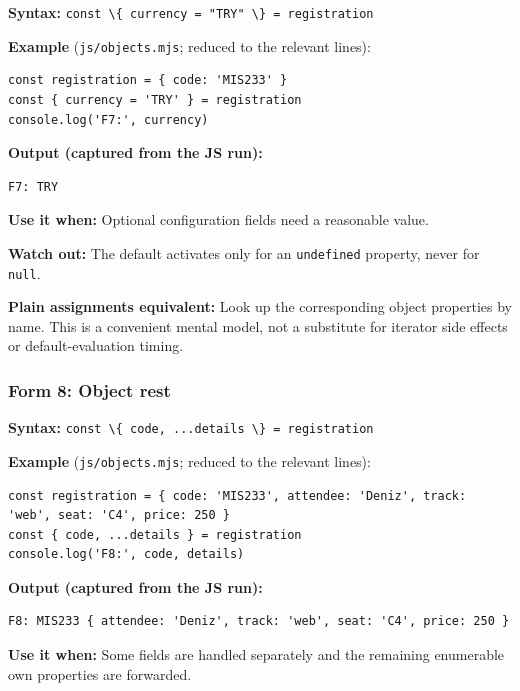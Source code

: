 \documentclass[
  10pt,
]{article}
\newcommand{\passthrough}[1]{#1}
\begin{document}
\textbf{Syntax:}
\passthrough{\lstinline!const \{ currency = "TRY" \} = registration!}

\textbf{Example} (\passthrough{\lstinline!js/objects.mjs!}; reduced to
the relevant lines):

\begin{lstlisting}
const registration = { code: 'MIS233' }
const { currency = 'TRY' } = registration
console.log('F7:', currency)
\end{lstlisting}

\textbf{Output (captured from the JS run):}

\begin{lstlisting}
F7: TRY
\end{lstlisting}

\textbf{Use it when:} Optional configuration fields need a reasonable
value.

\textbf{Watch out:} The default activates only for an
\passthrough{\lstinline!undefined!} property, never for
\passthrough{\lstinline!null!}.

\textbf{Plain assignments equivalent:} Look up the corresponding object
properties by name. This is a convenient mental model, not a substitute
for iterator side effects or default-evaluation timing.

\subsubsection{Form 8: Object rest}\label{form-8-object-rest}

\textbf{Syntax:}
\passthrough{\lstinline!const \{ code, ...details \} = registration!}

\textbf{Example} (\passthrough{\lstinline!js/objects.mjs!}; reduced to
the relevant lines):

\begin{lstlisting}
const registration = { code: 'MIS233', attendee: 'Deniz', track: 'web', seat: 'C4', price: 250 }
const { code, ...details } = registration
console.log('F8:', code, details)
\end{lstlisting}

\textbf{Output (captured from the JS run):}

\begin{lstlisting}
F8: MIS233 { attendee: 'Deniz', track: 'web', seat: 'C4', price: 250 }
\end{lstlisting}

\textbf{Use it when:} Some fields are handled separately and the
remaining enumerable own properties are forwarded.
\end{document}
